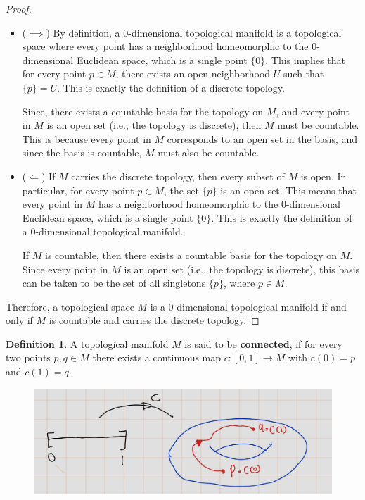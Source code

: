\documentclass[
]{book}
\theoremstyle{definition}
\newtheorem{definition}{Definition}[chapter]
\theoremstyle{definition}
\theoremstyle{definition}
\theoremstyle{definition}
\theoremstyle{remark}
\begin{document}
\begin{proof}
\leavevmode

\begin{itemize}
\item
  (\(\implies\)) By definition, a 0-dimensional topological manifold is a topological space where every point has a neighborhood homeomorphic to the 0-dimensional Euclidean space, which is a single point \(\{0\}\). This implies that for every point \(p \in M\), there exists an open neighborhood \(U\) such that \(\{p\} = U\). This is exactly the definition of a discrete topology.

  Since, there exists a countable basis for the topology on \(M\), and every point in \(M\) is an open set (i.e., the topology is discrete), then \(M\) must be countable. This is because every point in \(M\) corresponds to an open set in the basis, and since the basis is countable, \(M\) must also be countable.
\item
  (\(\Longleftarrow\)) If \(M\) carries the discrete topology, then every subset of \(M\) is open. In particular, for every point \(p \in M\), the set \(\{p\}\) is an open set. This means that every point in \(M\) has a neighborhood homeomorphic to the 0-dimensional Euclidean space, which is a single point \(\{0\}\). This is exactly the definition of a 0-dimensional topological manifold.

  If \(M\) is countable, then there exists a countable basis for the topology on \(M\). Since every point in \(M\) is an open set (i.e., the topology is discrete), this basis can be taken to be the set of all singletons \(\{p\}\), where \(p \in M\).
\end{itemize}

Therefore, a topological space \(M\) is a 0-dimensional topological manifold if and only if \(M\) is countable and carries the discrete topology.

\end{proof}

\begin{definition}
\protect\hypertarget{def:unnamed-chunk-15}{}\label{def:unnamed-chunk-15}A topological manifold \(M\) is said to be \textbf{connected}, if for every two points \(p, q \in M\) there exists a continuous map \(c : [0, 1] \to M\) with \(c(0) = p\) and \(c(1) = q\).
\end{definition}

\begin{figure}
\centering
\includegraphics{figures/ch1/fig08.png}
\caption{\label{fig:fig08}\(~\)}
\end{figure}
\end{document}
